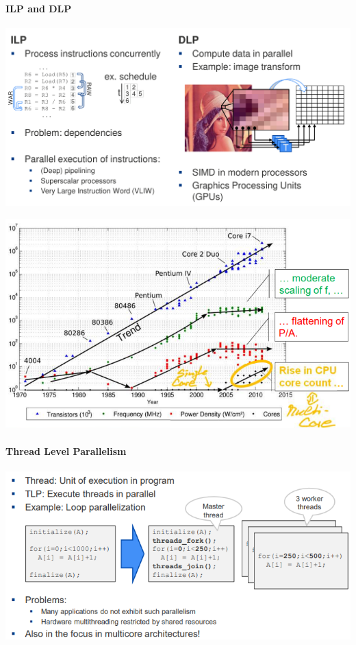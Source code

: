 \documentclass[fontsize=8pt]{scrartcl}
\begin{document}
\begin{multicols*}{4}
\paragraph{ILP and DLP}

\begin{center}
  \centering
  \includegraphics[width=0.8\linewidth]{img/ILPDLP.png}
  \label{fig:ilpdlp}
\end{center}

\begin{center}
  \centering
  \includegraphics[width=\linewidth]{img/power_wall.png}
  \label{fig:power_wall}
\end{center}

\paragraph{Thread Level Parallelism}

\begin{center}
  \centering
  \includegraphics[width=0.8\linewidth]{img/TLP.png}
  \label{fig:tlp}
\end{center}


\end{multicols*}
\end{document}
